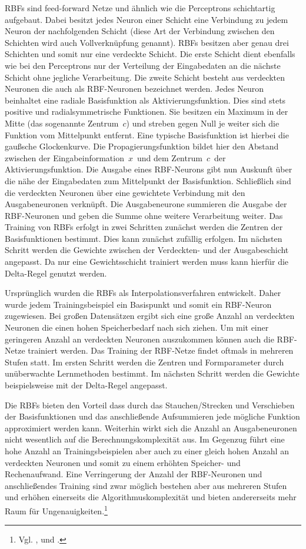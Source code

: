 RBFs sind feed-forward Netze und ähnlich wie die Perceptrons schichtartig aufgebaut. Dabei besitzt jedes Neuron einer Schicht eine Verbindung zu jedem Neuron der nachfolgenden Schicht (diese Art der Verbindung zwischen den Schichten wird auch Vollverknüpfung genannt). RBFs besitzen aber genau drei Schichten und somit nur eine verdeckte Schicht. Die erste Schicht dient ebenfalls wie bei den Perceptrons nur der Verteilung der Eingabedaten an die nächste Schicht ohne jegliche Verarbeitung. Die zweite Schicht besteht aus verdeckten Neuronen die auch als RBF-Neuronen  bezeichnet werden. Jedes Neuron beinhaltet eine radiale Basisfunktion als Aktivierungsfunktion. Dies sind stets positive und radialsymmetrische Funktionen. Sie besitzen ein Maximum in der Mitte (das sogenannte Zentrum~$c$) und streben gegen Null je weiter sich die Funktion vom Mittelpunkt entfernt. Eine typische Basisfunktion ist hierbei die gaußsche Glockenkurve. Die Propagierungsfunktion bildet hier den Abstand zwischen der Eingabeinformation~$x$~und dem Zentrum~$c$~der Aktivierungsfunktion. Die Ausgabe eines RBF-Neurons gibt nun Auskunft über die nähe der Eingabedaten zum Mittelpunkt der Basisfunktion. Schließlich sind die verdeckten Neuronen über eine gewichtete Verbindung mit den Ausgabeneuronen  verknüpft. Die Ausgabeneurone summieren die Ausgabe der RBF-Neuronen und geben die Summe ohne weitere Verarbeitung weiter. Das Training von RBFs erfolgt in zwei Schritten zunächst werden die Zentren der Basisfunktionen bestimmt. Dies kann zunächst zufällig erfolgen. Im nächsten Schritt werden die Gewichte zwischen der Verdeckten- und der Ausgabeschicht angepasst. Da nur eine Gewichtsschicht trainiert werden muss kann hierfür die Delta-Regel genutzt werden.

Ursprünglich wurden die RBFs als Interpolationsverfahren entwickelt. Daher wurde jedem Trainingsbeispiel ein Basispunkt und somit ein RBF-Neuron zugewiesen. Bei großen Datensätzen ergibt sich eine große Anzahl an verdeckten Neuronen die einen hohen Speicherbedarf nach sich ziehen. Um mit einer geringeren Anzahl an verdeckten Neuronen auszukommen können auch die RBF-Netze trainiert werden. Das Training der RBF-Netze findet oftmals in mehreren Stufen statt. Im ersten Schritt werden die Zentren und Formparameter durch unüberwachte Lernmethoden bestimmt. Im nächsten Schritt werden die Gewichte beispielsweise mit der Delta-Regel angepasst.

Die RBFs bieten den Vorteil dass durch das Stauchen/Strecken und Verschieben der Basisfunktionen und das anschließende Aufsummieren jede mögliche Funktion approximiert werden kann. Weiterhin wirkt sich die Anzahl an Ausgabeneuronen nicht wesentlich auf die Berechnungskomplexität aus. Im Gegenzug führt eine hohe Anzahl an Trainingsbeispielen aber auch zu einer gleich hohen Anzahl an verdeckten Neuronen und somit zu einem erhöhten Speicher- und Rechenaufwand. Eine Verringerung der Anzahl der RBF-Neuronen und anschließendes Training sind zwar möglich bestehen aber aus mehreren Stufen und erhöhen einerseits die Algorithmuskomplexität und bieten andererseits mehr Raum für Ungenauigkeiten.\footnote{Vgl. \citet[73 ff]{comp_int_07}, \citet[109 ff]{dkriesel07} und \citet[261 ff]{Kroll16}.}



